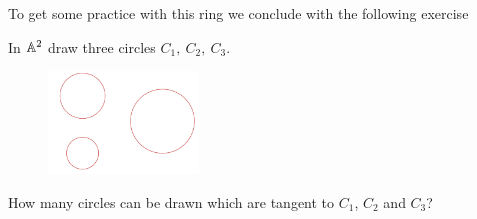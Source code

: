 To get some practice with this ring we conclude with the following exercise

\begin{exercise}
In $\mathbb{A}^2$ draw three circles $C_1,\ C_2,\ C_3$. 
\begin{figure}[!htb]
	\centering
	\includegraphics[width=4cm]{Images/Three-circles.png}
\end{figure}

How many circles can be drawn which are tangent to $C_1$, $C_2$ and $C_3$?
\end{exercise}
